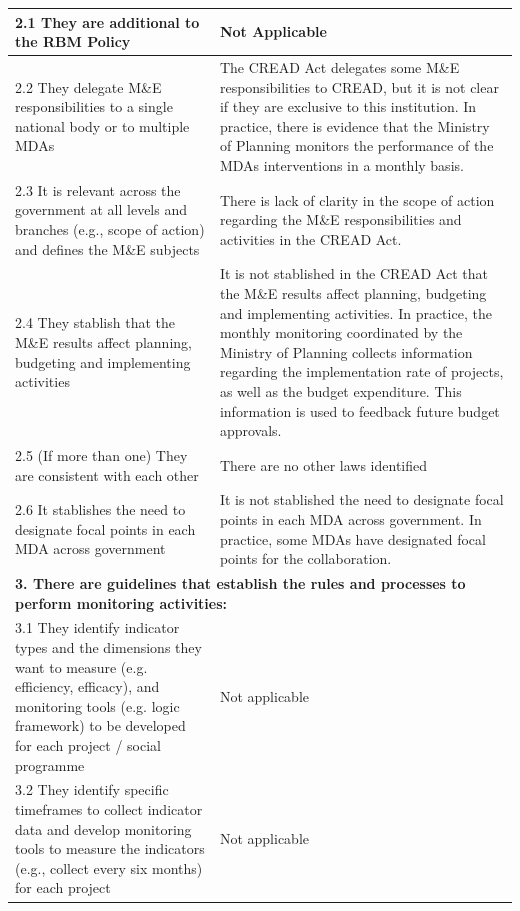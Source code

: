 \documentclass[
  10pt,
]{book}
\begin{document}
\begin{table}
\begin{tabular}[t]{l|l}
\hline
\hspace{1em}2.1 They are additional to the RBM Policy & Not Applicable\\
\hline
\hspace{1em}2.2 They delegate M\&E responsibilities to a single national body or to multiple MDAs & The CREAD Act delegates some M\&E responsibilities to CREAD, but it is not clear if they are exclusive to this institution. In practice, there is evidence that the Ministry of Planning monitors the performance of the MDAs interventions in a monthly basis.\\
\hline
\hspace{1em}2.3 It is relevant across the government at all levels and branches (e.g., scope of action) and defines the M\&E subjects & There is lack of clarity in the scope of action regarding the M\&E responsibilities and activities in the CREAD Act.\\
\hline
\hspace{1em}2.4 They stablish that the M\&E results affect planning, budgeting and implementing activities & It is not stablished in the CREAD Act that the M\&E results affect planning, budgeting and implementing activities. In practice, the monthly monitoring coordinated by the Ministry of Planning collects information regarding the implementation rate of projects, as well as the budget expenditure. This information is used to feedback future budget approvals.\\
\hline
\hspace{1em}2.5 (If more than one) They are consistent with each other & There are no other laws identified\\
\hline
\hspace{1em}2.6 It stablishes the need to designate focal points in each MDA across government & It is not stablished the need to designate focal points in each MDA across government. In practice, some MDAs have designated focal points for the collaboration.\\
\hline
\multicolumn{2}{l}{\textbf{3. There are guidelines that establish the rules and processes to perform monitoring activities:}}\\
\hline
\hspace{1em}3.1 They identify indicator types and the dimensions they want to measure (e.g. efficiency, efficacy), and monitoring tools (e.g. logic framework) to be developed for each project / social programme & Not applicable\\
\hline
\hspace{1em}3.2 They identify specific timeframes to collect indicator data and develop monitoring tools to measure the indicators (e.g., collect every six months) for each project & Not applicable\\

\end{tabular}
\end{table}
\end{document}
